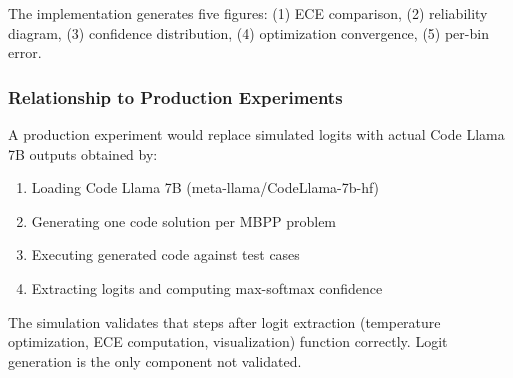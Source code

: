 The implementation generates five figures: (1) ECE comparison, (2) reliability diagram, (3) confidence distribution, (4) optimization convergence, (5) per-bin error.

\subsubsection{Relationship to Production Experiments}

A production experiment would replace simulated logits with actual Code Llama 7B outputs obtained by:
\begin{enumerate}
\item Loading Code Llama 7B (meta-llama/CodeLlama-7b-hf)
\item Generating one code solution per MBPP problem
\item Executing generated code against test cases
\item Extracting logits and computing max-softmax confidence
\end{enumerate}

The simulation validates that steps after logit extraction (temperature optimization, ECE computation, visualization) function correctly. Logit generation is the only component not validated.
